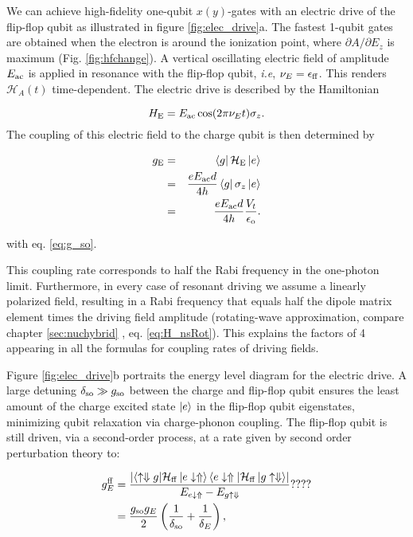 We can achieve high-fidelity one-qubit $x(y)$-gates with an electric drive of the flip-flop qubit as illustrated in figure \ref{fig:elec_drive}a.  The fastest 1-qubit gates are obtained when the electron is around the ionization point, where $\partial A/\partial E_z$ is maximum (Fig. \ref{fig:hfchange}). A vertical oscillating electric field of amplitude $E_{\rm ac}$ is applied in resonance with the flip-flop qubit, \textit{i.e}, $\nu_E=\epsilon_{\rm ff}$. This renders $\mathcal{H}_A(t)$ time-dependent. The electric drive is described by the Hamiltonian 

\begin{equation}
H_{\rm E}=E_{\rm ac}\cos(2\pi\nu_E t)\sigma_z.
\end{equation}
The coupling of this electric field to the charge qubit is then determined by 

\begin{eqnarray} \label{eq:g_E}
g_{\rm E}& =& \bra{g}\mathcal{H}_{\rm E}\ket{e}\\
 &=& \frac{e E_{\rm ac} d}{4h}\bra{g}\sigma_z\ket{e}\\
 & = &\frac{e E_{\rm ac} d}{4h}\frac{V_t}{\epsilon_{\rm o}}.
\end{eqnarray}

with eq. \eqref{eq:g_so}. 

This coupling rate corresponds to half the Rabi frequency in the one-photon limit. Furthermore, in every case of resonant driving we assume a linearly polarized field, resulting in a Rabi frequency that equals half the dipole matrix element times the driving field amplitude (rotating-wave approximation, compare chapter \ref{sec:nuchybrid} , eq. \eqref{eq:H_nsRot}). This explains the factors of 4 appearing in all the formulas for coupling rates of driving fields.

Figure \ref{fig:elec_drive}b portraits the energy level diagram for the electric drive.  A large detuning $\delta_{\rm so}\gg g_{\rm so}$ between the charge and flip-flop qubit ensures the least amount of the charge excited state $\ket{e}$ in the flip-flop qubit eigenstates, minimizing qubit relaxation via charge-phonon coupling. The flip-flop qubit is still driven, via a second-order process, at a rate given by second order perturbation theory to:
 
 \begin{equation}
 \label{eq:g_E_ff}
 \begin{aligned} 
g^{\rm ff}_{E}&=\frac{\left| \langle \uparrow\Downarrow g|\mathcal{H}_{\rm ff}\ket{e\downarrow\Uparrow}\langle e\downarrow\Uparrow|\mathcal{H}_{\rm ff}\ket{g\uparrow\Downarrow}\right|}{E_{e\downarrow\Uparrow}-E_{g\uparrow\Downarrow}} ???? \\
&=\frac{g_{\rm so}g_{E}}{2}\left(\frac{1}{\delta_{\rm so}}+\frac{1}{\delta_E}\right),
\end{aligned}
\end{equation}


